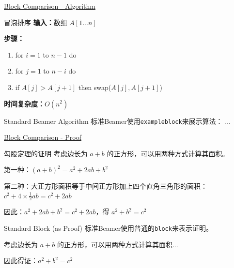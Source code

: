 \documentclass[11pt,aspectratio=43,xcolor={dvipsnames},hyperref={pdftex,pdfpagemode=UseNone,hidelinks,pdfdisplaydoctitle=true},usepdftitle=false]{ctexbeamer}
\begin{document}
\begin{frame}{\underline{Block Comparison - Algorithm}}
  \begin{chdalgorithm}{冒泡排序}
    \textbf{输入：}数组 $A[1...n]$
    
    \textbf{步骤：}
    \begin{enumerate}
      \item for $i = 1$ to $n-1$ do
      \item \quad for $j = 1$ to $n-i$ do
      \item \quad\quad if $A[j] > A[j+1]$ then swap($A[j], A[j+1]$)
    \end{enumerate}
    
    \textbf{时间复杂度：}$O(n^2)$
  \end{chdalgorithm}
  
  \vspace{0.2cm}
  
  \begin{exampleblock}{Standard Beamer Algorithm}
    标准Beamer使用\texttt{exampleblock}来展示算法：
    $\dots$
  \end{exampleblock}
\end{frame}

\begin{frame}{\underline{Block Comparison - Proof}}
  \begin{chdproof}{勾股定理的证明}
    考虑边长为 $a+b$ 的正方形，可以用两种方式计算其面积。
    
    第一种：$(a+b)^2 = a^2 + 2ab + b^2$
    
    第二种：大正方形面积等于中间正方形加上四个直角三角形的面积：
    $c^2 + 4 \times \frac{1}{2}ab = c^2 + 2ab$
    
    因此：$a^2 + 2ab + b^2 = c^2 + 2ab$，得 $a^2 + b^2 = c^2$
  \end{chdproof}
  
  \vspace{0.2cm}
  
  \begin{block}{Standard Block (as Proof)}
    标准Beamer使用普通的\texttt{block}来表示证明。
    
    考虑边长为 $a+b$ 的正方形，可以用两种方式计算其面积...
    
    因此得证：$a^2 + b^2 = c^2$
  \end{block}
\end{frame}

\begin{frame}
  \begin{center}
    \Huge{}
  \end{center}
\end{frame}
\end{document}
